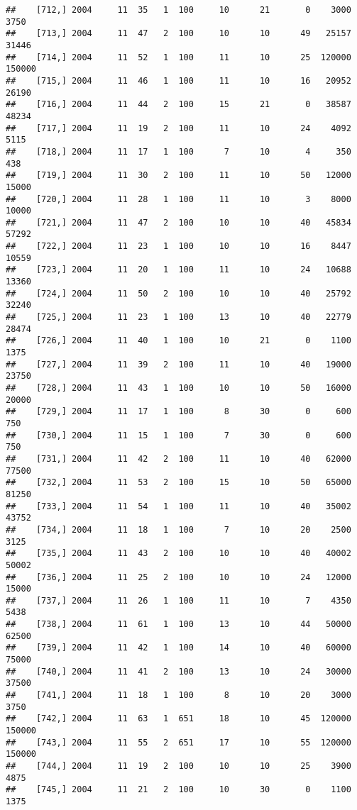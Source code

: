 \documentclass{article}\usepackage[]{graphicx}\usepackage[]{color}
\makeatletter
\newenvironment{kframe}{%
 \def\at@end@of@kframe{}%
 \ifinner\ifhmode%
  \def\at@end@of@kframe{\end{minipage}}%
  \begin{minipage}{\columnwidth}%
 \fi\fi%
 \def\FrameCommand##1{\hskip\@totalleftmargin \hskip-\fboxsep
 \colorbox{shadecolor}{##1}\hskip-\fboxsep
     \hskip-\linewidth \hskip-\@totalleftmargin \hskip\columnwidth}%
 \MakeFramed {\advance\hsize-\width
   \@totalleftmargin\z@ \linewidth\hsize
   \@setminipage}}%
 {\par\unskip\endMakeFramed%
 \at@end@of@kframe}
\newenvironment{knitrout}{}{} %
\makeatother
\begin{document}
\begin{knitrout}
\begin{kframe}
\begin{verbatim}
##    [712,] 2004     11  35   1  100     10      21       0    3000    3750
##    [713,] 2004     11  47   2  100     10      10      49   25157   31446
##    [714,] 2004     11  52   1  100     11      10      25  120000  150000
##    [715,] 2004     11  46   1  100     11      10      16   20952   26190
##    [716,] 2004     11  44   2  100     15      21       0   38587   48234
##    [717,] 2004     11  19   2  100     11      10      24    4092    5115
##    [718,] 2004     11  17   1  100      7      10       4     350     438
##    [719,] 2004     11  30   2  100     11      10      50   12000   15000
##    [720,] 2004     11  28   1  100     11      10       3    8000   10000
##    [721,] 2004     11  47   2  100     10      10      40   45834   57292
##    [722,] 2004     11  23   1  100     10      10      16    8447   10559
##    [723,] 2004     11  20   1  100     11      10      24   10688   13360
##    [724,] 2004     11  50   2  100     10      10      40   25792   32240
##    [725,] 2004     11  23   1  100     13      10      40   22779   28474
##    [726,] 2004     11  40   1  100     10      21       0    1100    1375
##    [727,] 2004     11  39   2  100     11      10      40   19000   23750
##    [728,] 2004     11  43   1  100     10      10      50   16000   20000
##    [729,] 2004     11  17   1  100      8      30       0     600     750
##    [730,] 2004     11  15   1  100      7      30       0     600     750
##    [731,] 2004     11  42   2  100     11      10      40   62000   77500
##    [732,] 2004     11  53   2  100     15      10      50   65000   81250
##    [733,] 2004     11  54   1  100     11      10      40   35002   43752
##    [734,] 2004     11  18   1  100      7      10      20    2500    3125
##    [735,] 2004     11  43   2  100     10      10      40   40002   50002
##    [736,] 2004     11  25   2  100     10      10      24   12000   15000
##    [737,] 2004     11  26   1  100     11      10       7    4350    5438
##    [738,] 2004     11  61   1  100     13      10      44   50000   62500
##    [739,] 2004     11  42   1  100     14      10      40   60000   75000
##    [740,] 2004     11  41   2  100     13      10      24   30000   37500
##    [741,] 2004     11  18   1  100      8      10      20    3000    3750
##    [742,] 2004     11  63   1  651     18      10      45  120000  150000
##    [743,] 2004     11  55   2  651     17      10      55  120000  150000
##    [744,] 2004     11  19   2  100     10      10      25    3900    4875
##    [745,] 2004     11  21   2  100     10      30       0    1100    1375

\end{verbatim}
\end{kframe}
\end{knitrout}
\end{document}
